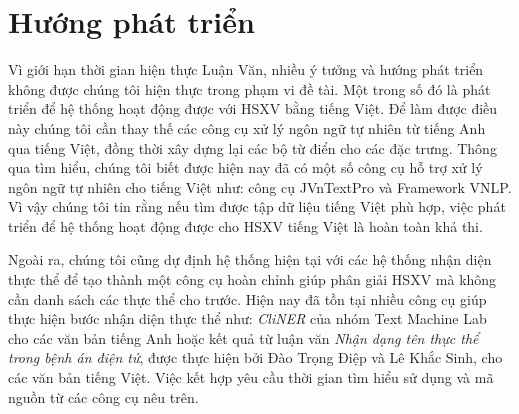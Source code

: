 \section{Hướng phát triển}
Vì giới hạn thời gian hiện thực Luận Văn, nhiều ý tưởng và hướng phát triển không được chúng tôi hiện thực trong phạm vi đề tài. Một trong số đó là phát triển để hệ thống hoạt động được với HSXV bằng tiếng Việt. Để làm được điều này chúng tôi cần thay thế các công cụ xử lý ngôn ngữ tự nhiên từ tiếng Anh qua tiếng Việt, đồng thời xây dựng lại các bộ từ điển cho các đặc trưng. Thông qua tìm hiểu, chúng tôi biết được hiện nay đã có một số công cụ hỗ trợ xử lý ngôn ngữ tự nhiên cho tiếng Việt như: công cụ JVnTextPro và Framework VNLP. Vì vậy chúng tôi tin rằng nếu tìm được tập dữ liệu tiếng Việt phù hợp, việc phát triển để hệ thống hoạt động được cho HSXV tiếng Việt là hoàn toàn khả thi.

Ngoài ra, chúng tôi cũng dự định hệ thống hiện tại với các hệ thống nhận diện thực thể để tạo thành một công cụ hoàn chỉnh giúp phân giải HSXV mà không cần danh sách các thực thể cho trước. Hiện nay đã tồn tại nhiều công cụ giúp thực hiện bước nhận diện thực thể như: \textit{CliNER} của nhóm Text Machine Lab cho các văn bản tiếng Anh hoặc kết quả từ luận văn \textit{Nhận dạng tên thực thể trong bệnh án điện tử}, được thực hiện bởi Đào Trọng Điệp và Lê Khắc Sinh, cho các văn bản tiếng Việt. Việc kết hợp yêu cầu thời gian tìm hiểu sử dụng và mã nguồn từ các công cụ nêu trên.